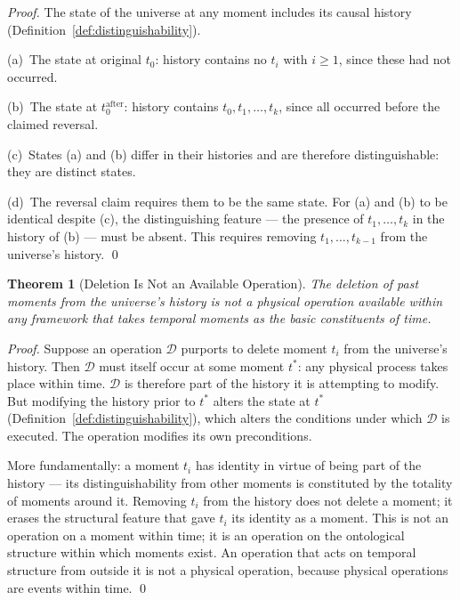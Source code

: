 \documentclass[twocolumn,10pt,a4paper]{article}
\theoremstyle{thmstyle}
\newtheorem{theorem}{Theorem}[section]
\theoremstyle{definition}
\theoremstyle{remark}
\begin{document}
\begin{proof}
The state of the universe at any moment includes its causal history (Definition~\ref{def:distinguishability}).

(a)~The state at original $t_0$: history contains no $t_i$ with $i \geq 1$, since these had not occurred.

(b)~The state at $t_0^{\mathrm{after}}$: history contains $t_0, t_1, \ldots, t_k$, since all occurred before the claimed reversal.

(c)~States (a) and (b) differ in their histories and are therefore distinguishable: they are distinct states.

(d)~The reversal claim requires them to be the same state. For (a) and (b) to be identical despite (c), the distinguishing feature --- the presence of $t_1, \ldots, t_k$ in the history of (b) --- must be absent. This requires removing $t_1, \ldots, t_{k-1}$ from the universe's history. \qed
\end{proof}

\begin{theorem}[Deletion Is Not an Available Operation]
\label{thm:no-deletion}
The deletion of past moments from the universe's history is not a physical operation available within any framework that takes temporal moments as the basic constituents of time.
\end{theorem}

\begin{proof}
Suppose an operation $\mathcal{D}$ purports to delete moment $t_i$ from the universe's history. Then $\mathcal{D}$ must itself occur at some moment $t^{*}$: any physical process takes place within time. $\mathcal{D}$ is therefore part of the history it is attempting to modify. But modifying the history prior to $t^{*}$ alters the state at $t^{*}$ (Definition~\ref{def:distinguishability}), which alters the conditions under which $\mathcal{D}$ is executed. The operation modifies its own preconditions.

More fundamentally: a moment $t_i$ has identity in virtue of being part of the history --- its distinguishability from other moments is constituted by the totality of moments around it. Removing $t_i$ from the history does not delete a moment; it erases the structural feature that gave $t_i$ its identity as a moment. This is not an operation on a moment within time; it is an operation on the ontological structure within which moments exist. An operation that acts on temporal structure from outside it is not a physical operation, because physical operations are events within time. \qed
\end{proof}
\end{document}
